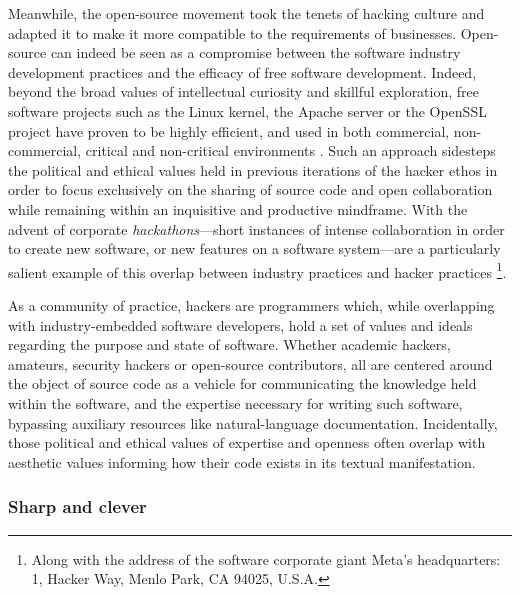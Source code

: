 Meanwhile, the open-source movement took the tenets of hacking culture and adapted it to make it more compatible to the requirements of businesses. Open-source can indeed be seen as a compromise between the software industry development practices and the efficacy of free software development. Indeed, beyond the broad values of intellectual curiosity and skillful exploration, free software projects such as the Linux kernel, the Apache server or the OpenSSL project have proven to be highly efficient, and used in both commercial, non-commercial, critical and non-critical environments \citep{raymond_cathedral_2001}. Such an approach sidesteps the political and ethical values held in previous iterations of the hacker ethos in order to focus exclusively on the sharing of source code and open collaboration while remaining within an inquisitive and productive mindframe. With the advent of corporate \emph{hackathons}—short instances of intense collaboration in order to create new software, or new features on a software system—are a particularly salient example of this overlap between industry practices and hacker practices \citep{nolte_you_2018}\footnote{Along with the address of the software corporate giant Meta's headquarters: 1, Hacker Way, Menlo Park, CA 94025, U.S.A.}.

\vspace{1\baselineskip}

As a community of practice, hackers are programmers which, while overlapping with industry-embedded software developers, hold a set of values and ideals regarding the purpose and state of software. Whether academic hackers, amateurs, security hackers or open-source contributors, all are centered around the object of source code as a vehicle for communicating the knowledge held within the software, and the expertise necessary for writing such software, bypassing auxiliary resources like natural-language documentation. Incidentally, those political and ethical values of expertise and openness often overlap with aesthetic values informing how their code exists in its textual manifestation.

\subsubsection{Sharp and clever}

